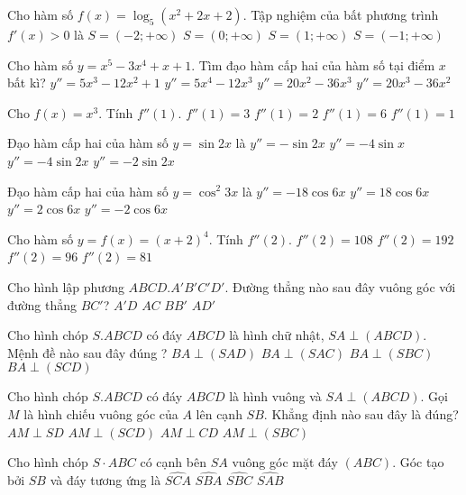 \begin{ex}
Cho hàm số $f(x)=\log _5(x^2+2x+2)$. Tập nghiệm của bất phương trình $f'(x)>0$ là
\choice
{$S=\left(-2;+\infty\right)$}
{$S=\left(0;+\infty\right)$}
{$S=\left(1;+\infty\right)$}
{ $S=\left(-1;+\infty\right)$}
\end{ex}
\begin{ex}
Cho hàm số $y=x^5-3x^4+x+1$. Tìm đạo hàm cấp hai của hàm số tại điểm $x$ bất kì?
\choice
{$y''=5x^3-12x^2+1$}
{$y''=5x^4-12x^3$}
{$y''=20x^2-36x^3$}
{$y''=20x^3-36x^2$}
\end{ex}
\begin{ex}
Cho ${f(x)=x^3}$. Tính $f''(1)$.
\choice
{$f''(1)=3$}
{$f''(1)=2$}
{$f''(1)=6$}
{$f''(1)=1$}
\end{ex}
\begin{ex}
Đạo hàm cấp hai của hàm số $y=\sin 2x$ là
\choice
{$y''=-\sin 2x$}
{$y''=-4\sin x$}
{$y''=-4\sin 2x$}
{$y''=-2\sin 2x$}
\end{ex}
\begin{ex}
Đạo hàm cấp hai của hàm số $y=\cos ^2 3x$ là
\choice
{$y''=-18\cos 6x$}
{$y''=18\cos 6x$}
{$y''=2\cos 6x$}
{$y''=-2\cos 6x$}
\end{ex}
\begin{ex}
Cho hàm số $y=f(x)={{(x+2)}^4}$. Tính $f''(2)$.
\choice
{$f''(2)=108$}
{$f''(2)=192$}
{$f''(2)=96$}
{$f''(2)=81$}
\end{ex}
\begin{ex}
Cho hình lập phương $ABCD.A'B'C'D'$. Đường thẳng nào sau đây vuông góc với đường thẳng $BC'$?
\choice
{$A'D$}
{$AC$}
{$BB'$}
{$AD'$}
\end{ex}
\begin{ex}
Cho hình chóp $S.ABCD$ có đáy $ABCD$ là hình chữ nhật, $SA\perp (ABCD)$. Mệnh đề nào sau đây đúng ?
\choice
{$BA\perp (SAD)$}
{$BA\perp (SAC)$}
{$BA\perp (SBC)$}
{$BA\perp (SCD)$}
\end{ex}
\begin{ex}
Cho hình chóp $S.ABCD$ có đáy $ABCD$ là hình vuông và $SA\perp (ABCD)$. Gọi $M$ là hình chiếu vuông góc của $A$ lên cạnh $SB$. Khẳng định nào sau đây là đúng?
\choice
{$AM\perp SD$}
{$AM\perp (SCD)$}
{$AM\perp CD$}
{$AM\perp (SBC)$}
\end{ex}
\begin{ex}
Cho hình chóp $S \cdot ABC$ có cạnh bên $SA$ vuông góc mặt đáy $(ABC)$. Góc tạo bởi $SB$ và đáy tương ứng là
\choice
{$\widehat{SCA}$}
{$\widehat{SBA}$}
{$\widehat{SBC}$}
{$\widehat{SAB}$}
\end{ex}
